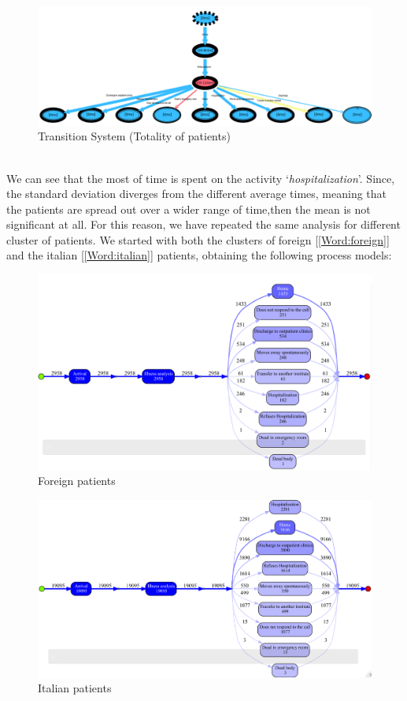 \begin{figure} [htbp]
\includegraphics[width=\textwidth, keepaspectratio]{ProntoSoccorsoTransitionSystemSojourn}
\caption{Transition System (Totality of patients)}
\end{figure}\\
We can see that the most of time is spent on the activity `\textit{hospitalization}'. Since, the standard deviation diverges from the different average times, meaning that the patients are spread out over a wider range of time,then the mean is not significant at all. For this reason, we have repeated the same analysis for different cluster of patients. We started with both the clusters of foreign [\ref{Word:foreign}] and the italian [\ref{Word:italian}] patients, obtaining the following process models:
\begin{figure} [htbp]
\includegraphics[width=\textwidth , keepaspectratio]{ProntoSoccorsoInductiveVisualMinerForeigns}
\caption{Foreign patients}
\end{figure}
\begin{figure} [htbp]
\includegraphics[width=\textwidth , keepaspectratio]{ProntoSoccorsoInductiveVisualMinerItalians}
\caption{Italian patients}
\end{figure}\\
